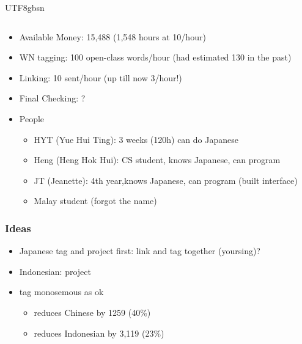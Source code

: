 \documentclass[12pt]{book} %
\begin{document}
\begin{CJK}{UTF8}{gbsn}
\begin{tabular}{lrrll}
\end{tabular}

\begin{itemize}
\item Available Money: 15,488 (1,548 hours at 10/hour)
\item WN tagging: 100 open-class words/hour (had estimated 130 in the past)
\item Linking: 10 sent/hour  (up till now 3/hour!)
\item Final Checking: ?
\item People
  \begin{itemize}
  \item HYT (Yue Hui Ting): 3 weeks (120h) can do Japanese
  \item Heng (Heng Hok Hui): CS student,  knows Japanese, can program
  \item JT (Jeanette): 4th year,knows Japanese, can program (built interface)
  \item Malay student (forgot the name)
  \end{itemize}
\end{itemize}

\subsubsection{Ideas}
\begin{itemize}
\item Japanese tag and project first: link and tag together (yoursing)?
\item Indonesian: project
\item tag monosemous as ok
  \begin{itemize}
  \item reduces Chinese by 1259 (40\%)
  \item reduces Indonesian by 3,119 (23\%) %
  \end{itemize}
\end{itemize}


\end{CJK}
\end{document}

